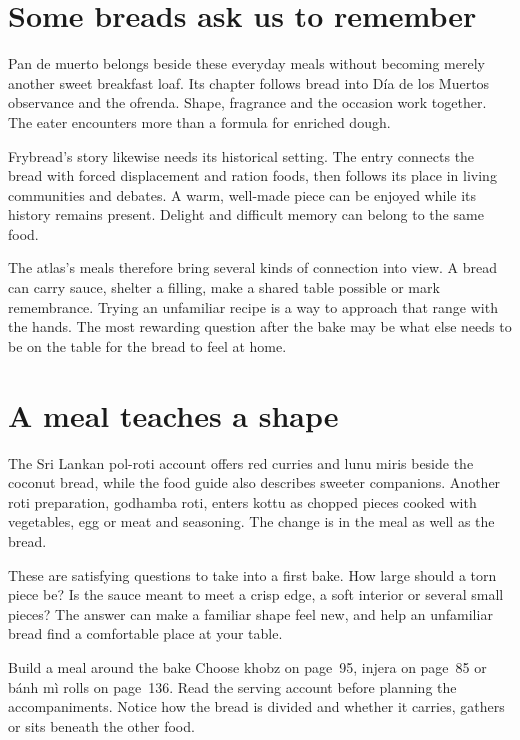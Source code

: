 \section{Some breads ask us to remember}
Pan de muerto belongs beside these everyday meals without becoming merely another sweet breakfast loaf. Its chapter follows bread into Día de los Muertos observance and the ofrenda. Shape, fragrance and the occasion work together. The eater encounters more than a formula for enriched dough.\citep{conacultamuerto08}

Frybread's story likewise needs its historical setting. The entry connects the bread with forced displacement and ration foods, then follows its place in living communities and debates. A warm, well-made piece can be enjoyed while its history remains present. Delight and difficult memory can belong to the same food.\citep{longwalk08,mihesuahfry08}

The atlas's meals therefore bring several kinds of connection into view. A bread can carry sauce, shelter a filling, make a shared table possible or mark remembrance. Trying an unfamiliar recipe is a way to approach that range with the hands. The most rewarding question after the bake may be what else needs to be on the table for the bread to feel at home.

\section{A meal teaches a shape}
The Sri Lankan pol-roti account offers red curries and lunu miris beside the coconut bread, while the food guide also describes sweeter companions. Another roti preparation, godhamba roti, enters kottu as chopped pieces cooked with vegetables, egg or meat and seasoning. The change is in the meal as well as the bread.\citep{roshanipol06,srilankafoods06,srilankakottu06}

These are satisfying questions to take into a first bake. How large should a torn piece be? Is the sauce meant to meet a crisp edge, a soft interior or several small pieces? The answer can make a familiar shape feel new, and help an unfamiliar bread find a comfortable place at your table.

\begin{breadnote}{Build a meal around the bake}
Choose khobz on page~95, injera on page~85 or bánh mì rolls on page~136. Read the serving account before planning the accompaniments. Notice how the bread is divided and whether it carries, gathers or sits beneath the other food.
\end{breadnote}
